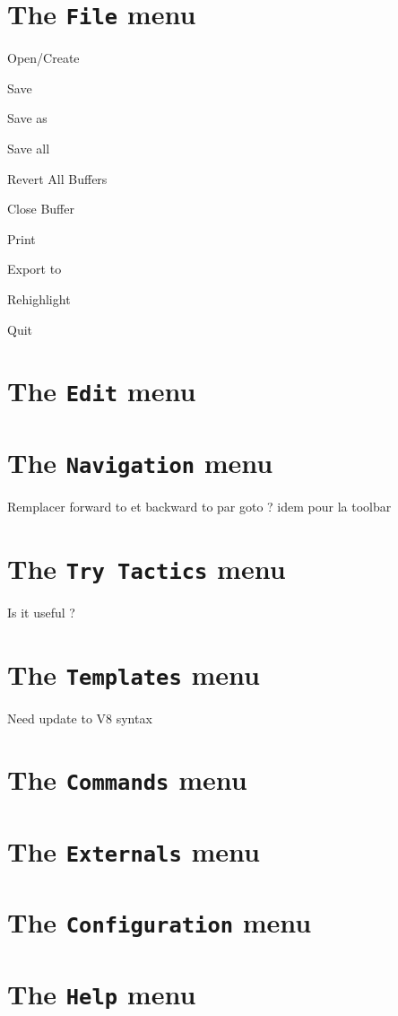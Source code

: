\section{The \texttt{File} menu}

Open/Create

Save

Save as

Save all

Revert All Buffers

Close Buffer

Print

Export to

Rehighlight

Quit

\section{The \texttt{Edit} menu}


\section{The \texttt{Navigation} menu}

Remplacer forward to et backward to par goto ?
idem pour la toolbar

\section{The \texttt{Try Tactics} menu}

Is it useful ?

\section{The \texttt{Templates} menu}

Need update to V8 syntax

\section{The \texttt{Commands} menu}

\section{The \texttt{Externals} menu}

\section{The \texttt{Configuration} menu}

\section{The \texttt{Help} menu}



